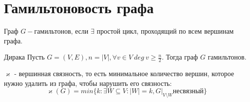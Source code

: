 \section{Гамильтоновость графа}
\begin{definition}
    Граф \(G - \)гамильтонов, если \(\exists\) простой цикл, проходящий по всем вершинам графа.
\end{definition}

\begin{theorem}{Дирака}
    Пусть \(G = (V, E), n = |V|, \forall v \in V \ deg \  v \ge \frac{n}{2}\). Тогда граф \(G\) гамильтонов.
\end{theorem}

\begin{definition}
    \(\varkappa\) - вершинная связность, то есть минимальное количество вершин, которое нужно удалить из графа, чтобы нарушить его связность:
    \[\varkappa(G) = min \{k : \exists W \subseteq V: |W| = k, G |_{V 
    \setminus W} \text{несвязный}\}\]
\end{definition}

